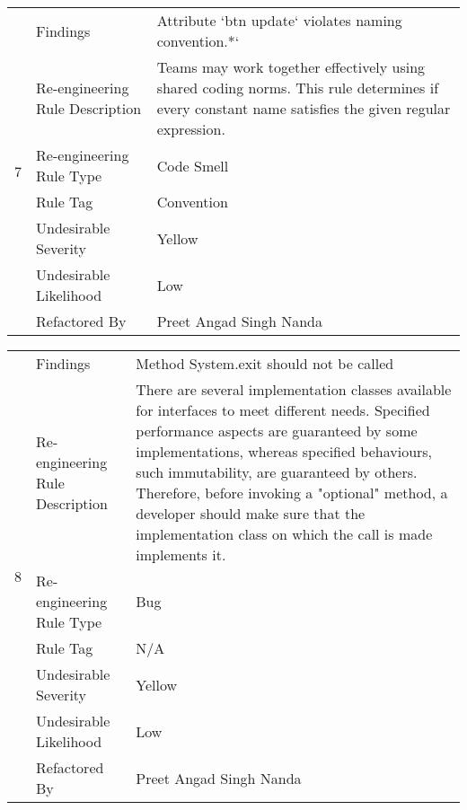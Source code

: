 \documentclass[12pt,english]{article}
\begin{document}
\begin{table}[!ht]
    \begin{tabularx}{\textwidth}{|c|l|X|}
    \hline
        \multirow{7}{*}{7} & Findings & Attribute ‘btn update‘ violates naming convention.*‘ \\ \cline{2-3}
        & Re-engineering Rule Description & Teams may work together effectively using shared coding norms. This rule determines if every constant name satisfies the given regular expression.\\ \cline{2-3}
        & Re-engineering Rule Type & Code Smell  \\ \cline{2-3}
        & Rule Tag & Convention \\ \cline{2-3}
        & Undesirable Severity & Yellow \\ \cline{2-3}
        & Undesirable Likelihood & Low \\ \cline{2-3}
        & Refactored By & Preet Angad Singh Nanda \\ \hline
    \end{tabularx}
\end{table}

\begin{table}[!ht]
    \begin{tabularx}{\textwidth}{|c|l|X|}
    \hline
        \multirow{7}{*}{8} & Findings & Method System.exit should not be called \\ \cline{2-3}
        & Re-engineering Rule Description & There are several implementation classes available for interfaces to meet different needs. Specified performance aspects are guaranteed by some implementations, whereas specified behaviours, such immutability, are guaranteed by others.
        Therefore, before invoking a "optional" method, a developer should make sure that the implementation class on which the call is made implements it.

\\ \cline{2-3}
        & Re-engineering Rule Type & Bug \\ \cline{2-3}
        & Rule Tag & N/A \\ \cline{2-3}
        & Undesirable Severity & Yellow \\ \cline{2-3}
        & Undesirable Likelihood & Low \\ \cline{2-3}
        & Refactored By & Preet Angad Singh Nanda \\ \hline
    \end{tabularx}
\end{table}
\end{document}
